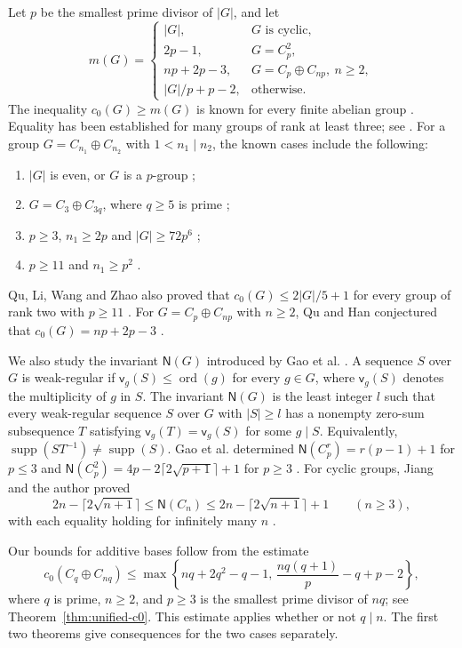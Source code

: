 \documentclass[10pt,reqno]{amsart}
\theoremstyle{definition}
\theoremstyle{remark}
\numberwithin{equation}{section}
\DeclareMathOperator{\ord}{ord}
\DeclareMathOperator{\supp}{supp}
\begin{document}
Let $p$ be the smallest prime divisor of $|G|$, and let
\[
m(G)=
\begin{cases}
|G|,&G\text{ is cyclic},\\
2p-1,&G=C_p^2,\\
np+2p-3,&G=C_p\oplus C_{np},\ n\ge2,\\
|G|/p+p-2,&\text{otherwise}.
\end{cases}
\]
The inequality $c_0(G)\ge m(G)$ is known for every finite abelian group
\cite[Lemma~2.3]{[GQZ2020]}. Equality has been established for many
groups of rank at least three; see \cite{[GHQQZ2015],[GQZ2020]}.
For a group $G=C_{n_1}\oplus C_{n_2}$ with $1<n_1\mid n_2$,
the known cases include the following:
\begin{enumerate}
\item $|G|$ is even, or $G$ is a $p$-group
      \cite{[GHQQZ2015],[QH2017]};
\item $G=C_3\oplus C_{3q}$, where $q\ge5$ is prime
      \cite{[QL2022]};
\item $p\ge3$, $n_1\ge2p$ and $|G|\ge72p^6$
      \cite{[GLQW2022]};
\item $p\ge11$ and $n_1\ge p^2$
      \cite{[QLWZ2025]}.
\end{enumerate}
Qu, Li, Wang and Zhao also proved that $c_0(G)\le2|G|/5+1$ for
every group of rank two with $p\ge11$
\cite[Lemma~7]{[QLWZ2025]}.
For $G=C_p\oplus C_{np}$ with $n\ge2$, Qu and Han conjectured
that $c_0(G)=np+2p-3$ \cite[Concluding Remark]{[QH2017]}.

We also study the invariant $\mathsf N(G)$ introduced by Gao et al.
\cite{[GHHLYZ2022-1]}. A sequence $S$ over $G$ is weak-regular if
$\mathsf v_g(S)\le\ord(g)$ for every $g\in G$, where $\mathsf v_g(S)$
denotes the multiplicity of $g$ in $S$.
The invariant $\mathsf N(G)$ is the least integer $l$ such that every
weak-regular sequence $S$ over $G$ with $|S|\ge l$ has a nonempty
zero-sum subsequence $T$ satisfying $\mathsf v_g(T)=\mathsf v_g(S)$
for some $g\mid S$. Equivalently, $\supp(ST^{-1})\ne\supp(S)$.
Gao et al. determined
$\mathsf N(C_p^r)=r(p-1)+1$ for $p\le3$ and
$\mathsf N(C_p^2)=4p-2\lceil2\sqrt{p+1}\rceil+1$ for $p\ge3$
\cite[Theorem~1.3]{[GHHLYZ2022-2]}.
For cyclic groups, Jiang and the author proved
\[
2n-\lceil2\sqrt{n+1}\rceil
\le\mathsf N(C_n)
\le2n-\lceil2\sqrt{n+1}\rceil+1
\qquad(n\ge3),
\]
with each equality holding for infinitely many $n$
\cite[Theorem~1.1]{[JY2024]}.

Our bounds for additive bases follow from the estimate
\[
c_0(C_q\oplus C_{nq})\le
\max\left\{nq+2q^2-q-1,\,
\frac{nq(q+1)}p-q+p-2\right\},
\]
where $q$ is prime, $n\ge2$, and $p\ge3$ is the smallest prime
divisor of $nq$; see Theorem~\ref{thm:unified-c0}.
This estimate applies whether or not $q\mid n$.
The first two theorems give consequences for the two cases separately.
\end{document}
